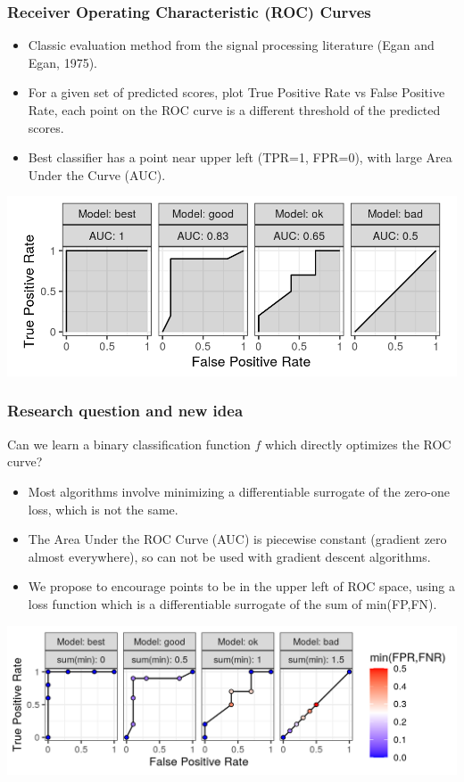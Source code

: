 \documentclass[t]{beamer}
\begin{document}
\begin{frame}
  \frametitle{Receiver Operating Characteristic (ROC) Curves}
  \begin{itemize}
  \item Classic evaluation method from the signal processing
    literature (Egan and Egan, 1975).
  \item For a given set of predicted scores, plot True Positive Rate
    vs False Positive Rate, each point on the ROC curve is a different
    threshold of the predicted scores.
  \item Best classifier has a point near upper left (TPR=1, FPR=0), with large
    Area Under the Curve (AUC).
  \end{itemize}
  \includegraphics[width=\textwidth]{figure-more-than-one-binary}
\end{frame}

\begin{frame}
  \frametitle{Research question and new idea}
  Can we learn a binary classification function $f$ which directly
  optimizes the ROC curve?
  \begin{itemize}
  \item Most algorithms involve minimizing a differentiable surrogate
    of the zero-one loss, which is not the same.
  \item The Area Under the ROC Curve (AUC) is piecewise constant
    (gradient zero almost everywhere), so can not be used with
    gradient descent algorithms.
  \item We propose to encourage points to be in the upper left of ROC
    space, using a loss function which is a differentiable surrogate
    of the sum of min(FP,FN).
  \end{itemize}
  \includegraphics[width=\textwidth]{figure-more-than-one-binary-dots}
\end{frame}
 
\end{document}
